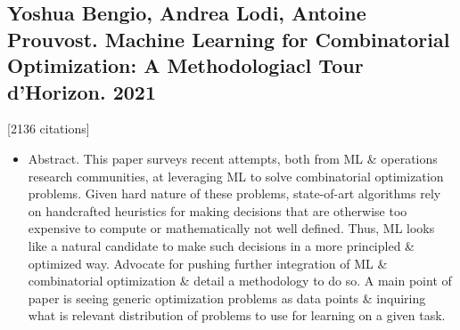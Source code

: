\documentclass{article}
\begin{document}

\subsection{{\sc Yoshua Bengio, Andrea Lodi, Antoine Prouvost}. Machine Learning for Combinatorial Optimization: A Methodologiacl Tour d'Horizon. 2021}
[2136 citations]
\begin{itemize}
    \item {\sf Abstract.} This paper surveys recent attempts, both from ML \& operations research communities, at leveraging ML to solve combinatorial optimization problems. Given hard nature of these problems, state-of-art algorithms rely on handcrafted heuristics for making decisions that are otherwise too expensive to compute or mathematically not well defined. Thus, ML looks like a natural candidate to make such decisions in a more principled \& optimized way. Advocate for pushing further integration of ML \& combinatorial optimization \& detail a methodology to do so. A main point of paper is seeing generic optimization problems as data points \& inquiring what is relevant distribution of problems to use for learning on a given task.


\end{itemize}
\end{document}
